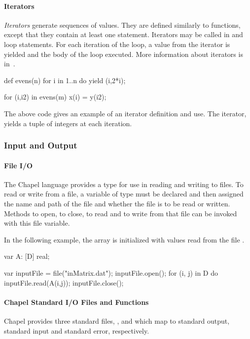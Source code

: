 \paragraph{Iterators}
\emph{Iterators} generate sequences of values.
They are defined similarly to functions, except that
they contain at least one  statement.
Iterators may be called in  and  loop
statements.  For each iteration of the loop, a value from the
iterator is yielded and the body of the loop executed.
More information about iterators is in~.
\begin{example}
\begin{chapel}
def evens(n) {
  for i in 1..n do yield (i,2*i);
}

for (i,i2) in evens(m) {
  x(i) = y(i2);
}
\end{chapel}
The above code gives an example of an iterator definition and use.
The iterator,  yields a tuple of integers at each iteration.
\end{example}

\subsubsection{Input and Output}
\label{Intro_Input_and_Output}

\paragraph{File I/O}
The Chapel language provides a  type for use in reading and
writing to files.  To read or write from a file, a variable of 
type must be declared and then assigned the name and path of the file 
and whether the file is to be read or written.  Methods to open, to close,
to read and to write from that file can be invoked with this file
variable.

\begin{example}
In the following example, the array  is initialized with
values read from the file .
\begin{chapel}
var A: [D] real;

var inputFile = file("inMatrix.dat");
inputFile.open();
for (i, j) in D do inputFile.read(A(i,j));
inputFile.close();
\end{chapel}
\end{example}

\paragraph{Chapel Standard I/O Files and Functions}
Chapel provides three standard files, , 
and  which map to standard output, standard input and
standard error, respectively.

